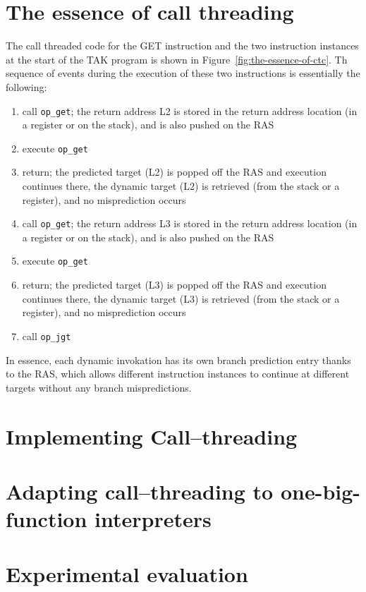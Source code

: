 \documentclass[10pt,a4paper]{article}
\begin{document}
\section{The essence of call threading}
The call threaded code for the GET instruction
and the two instruction instances at the start
of the TAK program is shown in Figure~\ref{fig:the-essence-of-ctc}.
Th sequence of events during the execution of
these two instructions is essentially the following:

\begin{enumerate}
\item call \texttt{op\_get};
the return address L2 is stored in the return address location
(in a register or on the stack), and is also pushed on the RAS
\item execute \texttt{op\_get}
\item return;
the predicted target (L2) is popped off the RAS and execution
continues there, the dynamic target (L2) is retrieved (from the
stack or a register), and no misprediction occurs
\item call \texttt{op\_get};
the return address L3 is stored in the return address location
(in a register or on the stack), and is also pushed on the RAS
\item execute \texttt{op\_get}
\item return;
the predicted target (L3) is popped off the RAS and execution
continues there, the dynamic target (L3) is retrieved (from the
stack or a register), and no misprediction occurs
\item call \texttt{op\_jgt}
\end{enumerate}
\par\noindent In essence, each dynamic invokation has its own
branch prediction entry thanks to the RAS, which allows different
instruction instances to continue at different targets without
any branch mispredictions.
%
\section{Implementing Call--threading}
%
\section{Adapting call--threading to one-big-function interpreters}
%
\section{Experimental evaluation}
\end{document}
